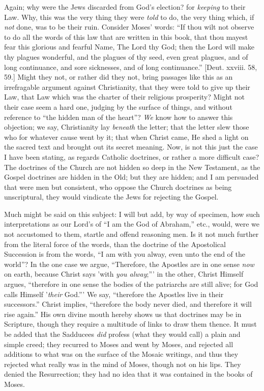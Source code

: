 Again; why were the Jews discarded from God's election? for \emph{keeping}
to their Law. Why, this was the very thing they were \emph{told} to
do, the very thing which, if \emph{not} done, was to be their ruin.
Consider Moses' words: ``If thou wilt not observe to do all the
words of this law that are written in this book, that thou mayest fear
this glorious and fearful Name, The Lord thy God; then the Lord will
make thy plagues wonderful, and the plagues of thy seed, even great
plagues, and of long continuance, and sore sicknesses, and of
long continuance.'' [Deut. xxviii. 58, 59.] Might they not, or
rather did they not, bring passages like this as an irrefragable
argument against Christianity, that they were told to give up their
Law, that Law which was the charter of their religious prosperity?
Might not their case seem a hard one, judging by the surface of
things, and without reference to ``the hidden man of the
heart''? \emph{We} know how to answer this objection; we say,
Christianity lay \emph{beneath} the letter; that the letter slew those
who for whatever cause went by it; that when Christ came, He shed a
light on the sacred text and brought out its secret meaning. Now, is
not this just the case I have been stating, as regards Catholic
doctrines, or rather a more difficult case? The doctrines of the
Church are not hidden so deep in the New Testament, as the Gospel
doctrines are hidden in the Old; but they are hidden; and I am
persuaded that were men but consistent, who oppose the Church
doctrines as being unscriptural, they would vindicate the Jews for
rejecting the Gospel.

Much might be said on this subject: I will but add, by way of
specimen, how such interpretations as our Lord's of ``I am the God
of Abraham,'' etc., would, were we not accustomed to them, startle
and offend reasoning men. Is it not much further from the literal
force of the words, than the doctrine of the Apostolical Succession is
from the words, ``I am with you alway, even unto the end of the
world''? In the one case we argue, ``Therefore, the Apostles
are in one sense \emph{now} on earth, because Christ says 'with \emph{you
alway};''' in the other, Christ Himself argues, ``therefore
in one sense the bodies of the patriarchs are still alive; for God
calls Himself '\emph{their} God.''' We say, ``therefore the
Apostles live in their successors.'' Christ implies,
``therefore the body never died, and therefore it will rise
again.'' His own divine mouth hereby shows us that doctrines may
be in Scripture, though they require a multitude of links to draw them
thence. It must be added that the Sadducees \emph{did} profess (what
they would call) a plain and simple creed; they recurred to Moses and
went by Moses, and rejected all additions to what was on the surface
of the Mosaic writings, and thus they rejected what really was in the
mind of Moses, though not on his lips. They denied the Resurrection;
they had no idea that it was contained in the books of Moses.

